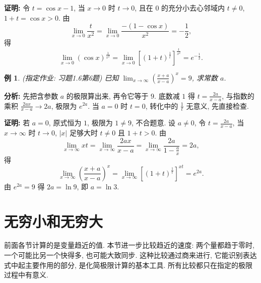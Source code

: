 \documentclass[UTF8,openany]{ctexbook}
\theoremstyle{chinesetextbook}
\newtheorem{example}{例}[section]
\newenvironment{cnproof}{\par\indent\textbf{证明:} \ignorespaces}{\par}
\begin{document}
\begin{cnproof}
令 $t=\cos x-1$, 当 $x\to0$ 时 $t\to0$, 且在 $0$ 的充分小去心邻域内 $t\ne0$, $1+t=\cos x>0$. 由
\[
\lim_{x\to0}\frac t{x^2}=\lim_{x\to0}\frac{-(1-\cos x)}{x^2}=-\frac12,
\]
得
\[
\lim_{x\to0}(\cos x)^{\frac1{x^2}}
=\lim_{x\to0}\left[(1+t)^{\frac1t}\right]^{\frac t{x^2}}=e^{-\frac12}.
\]
\end{cnproof}
\begin{example}
\textnormal{(指定作业: 习题1.6第6题)} 已知 $\displaystyle \lim_{x\to\infty}\left(\frac{x+a}{x-a}\right)^x=9$, 求常数 $a$.
\end{example}
\par\indent\textbf{分析:} 先把含参数 $a$ 的极限算出来, 再令它等于 $9$. 底数减 $1$ 得 $\displaystyle t=\frac{2a}{x-a}$, 与指数的乘积 $\displaystyle\frac{2ax}{x-a}\to2a$, 极限为 $e^{2a}$. 当 $a=0$ 时 $t=0$, 转化中的 $\displaystyle\frac1t$ 无意义, 先直接检查.
\begin{cnproof}
若 $a=0$, 原式恒为 $1$, 极限为 $1\ne9$, 不合题意. 设 $a\ne0$, 令 $\displaystyle t=\frac{2a}{x-a}$, 当 $x\to\infty$ 时 $t\to0$, $|x|$ 足够大时 $t\ne0$ 且 $1+t>0$. 由
\[
\lim_{x\to\infty}xt=\lim_{x\to\infty}\frac{2ax}{x-a}=\lim_{x\to\infty}\frac{2a}{1-\frac ax}=2a,
\]
得
\[
\lim_{x\to\infty}\left(\frac{x+a}{x-a}\right)^x
=\lim_{x\to\infty}\left[(1+t)^{\frac1t}\right]^{xt}=e^{2a}.
\]
由 $e^{2a}=9$ 得 $2a=\ln9$, 即 $a=\ln3$.
\end{cnproof}

\section{无穷小和无穷大}
前面各节计算的是变量趋近的值. 本节进一步比较趋近的速度: 两个量都趋于零时, 一个可能比另一个快得多, 也可能大致同步. 这种比较通过商来进行, 它能识别表达式中起主要作用的部分, 是化简极限计算的基本工具. 所有比较都只在指定的极限过程中有意义.
\end{document}
